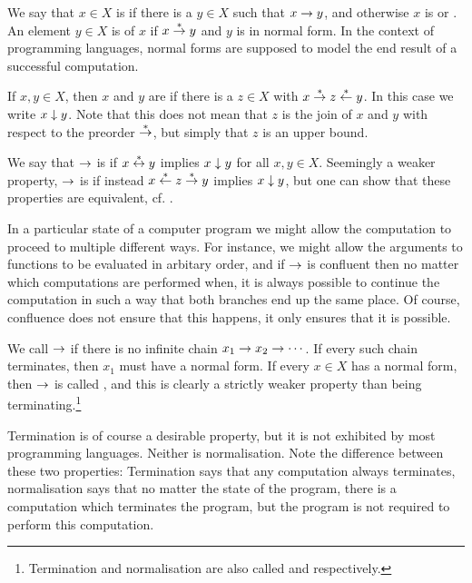\documentclass[a4paper, 11pt, article, danish, oneside]{memoir}
\begin{document}
\begin{remarkbreak}
    \begin{enumrem}
        \item We say that $x \in X$ is  if there is a $y \in X$ such that $x \rightarrow y$, and otherwise $x$ is  or . An element $y \in X$ is  of $x$ if $x \overset{*}{\rightarrow} y$ and $y$ is in normal form. In the context of programming languages, normal forms are supposed to model the end result of a successful computation.
        
        \item If $x,y \in X$, then $x$ and $y$ are  if there is a $z \in X$ with $x \overset{*}{\rightarrow} z \overset{*}{\leftarrow} y$. In this case we write $x \downarrow y$. Note that this does not mean that $z$ is the join of $x$ and $y$ with respect to the preorder $\overset{*}{\rightarrow}$, but simply that $z$ is an upper bound.

        We say that $\rightarrow$ is  if $x \overset{*}{\leftrightarrow} y$ implies $x \downarrow y$ for all $x,y \in X$. Seemingly a weaker property, $\rightarrow$ is  if instead $x \overset{*}{\leftarrow} z \overset{*}{\rightarrow} y$ implies $x \downarrow y$, but one can show that these properties are equivalent, cf. \textcite[Theorem~2.1.5]{baader-nipkow-term-rewriting}.

        In a particular state of a computer program we might allow the computation to proceed to multiple different ways. For instance, we might allow the arguments to functions to be evaluated in arbitary order, and if $\rightarrow$ is confluent then no matter which computations are performed when, it is always possible to continue the computation in such a way that both branches end up the same place. Of course, confluence does not ensure that this happens, it only ensures that it is possible.

        \item We call $\rightarrow$  if there is no infinite chain $x_1 \rightarrow x_2 \rightarrow \cdots$. If every such chain terminates, then $x_1$ must have a normal form. If every $x \in X$ has a normal form, then $\rightarrow$ is called , and this is clearly a strictly weaker property than being terminating.\footnote{Termination and normalisation are also called  and  respectively.}

        Termination is of course a desirable property, but it is not exhibited by most programming languages. Neither is normalisation. Note the difference between these two properties: Termination says that any computation always terminates, normalisation says that no matter the state of the program, there is a computation which terminates the program, but the program is not required to perform this computation.
    \end{enumrem}
\end{remarkbreak}
\end{document}
